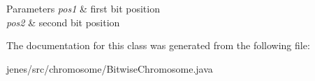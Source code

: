 \begin{DoxyParams}{Parameters}
{\em pos1} & first bit position \\
\hline
{\em pos2} & second bit position \\
\hline
\end{DoxyParams}


The documentation for this class was generated from the following file\-:\begin{DoxyCompactItemize}
\item 
jenes/src/chromosome/Bitwise\-Chromosome.\-java\end{DoxyCompactItemize}
